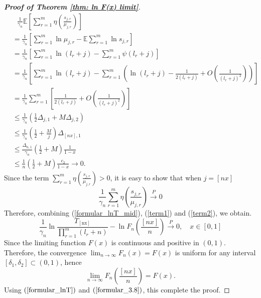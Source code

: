 \documentclass[12pt]{article}
\theoremstyle{plain}
\theoremstyle{definition}
\theoremstyle{remark}
\begin{document}
\begin{proof}[\textit{\textbf{Proof of Theorem \ref{thm: ln F(x) limit}}}]
    \begin{equation*}
        \begin{aligned}&\ \ \ \frac{1}{\gamma_{n}} \mathbb{E}\left[\sum_{r=1}^{m} \eta\left(\frac{s_{j, r}}{\mu_{j, r}}\right)\right]\\
            &=\frac{1}{\gamma_{n}} \left[  \sum_{r=1}^{m} \ln \mu_{j, r}-\mathbb{E} \sum_{r=1}^{m} \ln s_{j, r}\right] \\
            &=\frac{1}{\gamma_{n}}\left[\sum_{r=1}^{m} \ln \left(l_{r}+j\right)- \sum_{r=1}^{m} \psi\left(l_{r}+j\right)\right] \\
            &=\frac{1}{\gamma_{n}}\left[\sum_{r=1}^{m} \ln \left(l_{r}+j\right)-\sum_{r=1}^{m}\left (    \ln \left(l_{r}+j\right)-\frac{1}{2\left(l_{r}+j\right)}+O\left(\frac{1}{\left(l_{r}+j\right)^{2}}\right)\right) \right] \\
            &=\frac{1}{\gamma_{n}}\sum_{r=1}^{m} \left[\frac{1}{2\left(l_{r}+j\right)}+O\left(\frac{1}{\left(l_{r}+j\right)^{2}}\right)\right] \\
            &\leq\frac{1}{\gamma_{n}} \left( \frac{1}{2}\Delta_{j, 1}+M\Delta_{j, 2} \right)\\
            &\leq\frac{1}{\gamma_{n}} (\frac{1}{2}+\frac{M}{j})\Delta_{[nx], 1}\\
            &\leq\frac{\Delta_{n, 1}}{\gamma_{n}} (\frac{1}{2}+M)\frac{1}{1-x}\\
            &\leq\frac{1}{n} (\frac{1}{2}+M)\frac{c_2}{1-x}\to 0.
        \end{aligned}
    \end{equation*}
    Since the term  $\sum_{r=1}^{m} \eta\left(\frac{s_{j, r}}{\mu_{j, r}}\right)>0$, it is easy to show that when $j=[nx]$
    \begin{equation}\label{term2}
    \frac{1}{\gamma_{n}}\sum_{r=1}^{m} \eta\left(\frac{s_{j, r}}{\mu_{j, r}}\right) \stackrel{P}{\rightarrow} 0
    \end{equation}
    Therefore, combining (\ref{formular_lnT_mid}), (\ref{term1}) and (\ref{term2}), we obtain.
    \begin{equation}\label{formular_lnT}
    \frac{1}{\gamma_{n}} \ln \frac{T_{[\mathrm{nx}]}}{\prod_{r=1}^{m}(l_r+n)}-\ln F_n(\frac{[nx]}{n}) \stackrel{P}{\rightarrow} 0, \quad x \in[0,1]
    \end{equation}
    Since the limiting function $F(x)$ is continuous and positive in $(0,1)$. Therefore, the convergence
    $\lim _{n \rightarrow \infty} F_{n}(x)=F(x)$ is uniform for any interval $\left[\delta_{1}, \delta_{2}\right] \subset(0,1)$, hence
    \begin{equation}\label{formular_3.8}
    \lim _{n \rightarrow \infty} F_{n}\left(\frac{[n x]}{n}\right)=F(x).
    \end{equation}
    Using $(\ref{formular_lnT})$ and $(\ref{formular_3.8})$, this complete the proof.
\end{proof}
\end{document}
